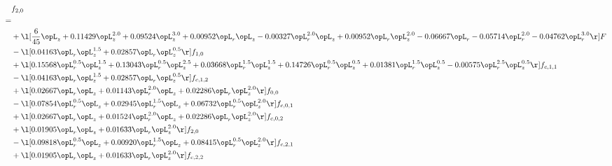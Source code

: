 \begin{alignat}{2} 
\label{eq:f_20_1} 
& f_{2,0} \nonumber \\ 
 = \\ 
& + \l[ \frac{6}{45} \opL_z +  0.11429 \opL_z^{2.0} +  0.09524 \opL_z^{3.0} +  0.00952 \opL_r \opL_z   -0.00327 \opL_r^{2.0} \opL_z +  0.00952 \opL_r \opL_z^{2.0}   -0.06667 \opL_r   -0.05714 \opL_r^{2.0}   -0.04762 \opL_r^{3.0}  \r] F \nonumber \\ 
& - \l[  0.04163 \opL_r \opL_z^{1.5} +  0.02857 \opL_r \opL_z^{0.5}  \r] f_{1,0} \nonumber \\ 
& + \l[  0.15568 \opL_r^{0.5} \opL_z^{1.5} +  0.13043 \opL_r^{0.5} \opL_z^{2.5} +  0.03668 \opL_r^{1.5} \opL_z^{1.5} +  0.14726 \opL_r^{0.5} \opL_z^{0.5} +  0.01381 \opL_r^{1.5} \opL_z^{0.5}   -0.00575 \opL_r^{2.5} \opL_z^{0.5}  \r] f_{c,1,1} \nonumber \\ 
& - \l[  0.04163 \opL_r \opL_z^{1.5} +  0.02857 \opL_r \opL_z^{0.5}  \r] f_{c,1,2} \nonumber \\ 
& + \l[  0.02667 \opL_r \opL_z +  0.01143 \opL_r^{2.0} \opL_z +  0.02286 \opL_r \opL_z^{2.0}  \r] f_{0,0} \nonumber \\ 
& - \l[  0.07854 \opL_r^{0.5} \opL_z +  0.02945 \opL_r^{1.5} \opL_z +  0.06732 \opL_r^{0.5} \opL_z^{2.0}  \r] f_{c,0,1} \nonumber \\ 
& + \l[  0.02667 \opL_r \opL_z +  0.01524 \opL_r^{2.0} \opL_z +  0.02286 \opL_r \opL_z^{2.0}  \r] f_{c,0,2} \nonumber \\ 
& + \l[  0.01905 \opL_r \opL_z +  0.01633 \opL_r \opL_z^{2.0}  \r] f_{2,0} \nonumber \\ 
& - \l[  0.09818 \opL_r^{0.5} \opL_z +  0.00920 \opL_r^{1.5} \opL_z +  0.08415 \opL_r^{0.5} \opL_z^{2.0}  \r] f_{c,2,1} \nonumber \\ 
& + \l[  0.01905 \opL_r \opL_z +  0.01633 \opL_r \opL_z^{2.0}  \r] f_{c,2,2} \nonumber \\ 
\end{alignat} 


